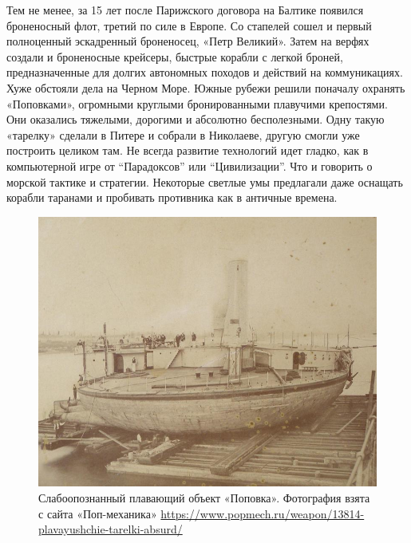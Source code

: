 Тем не менее, за 15 лет после Парижского договора на Балтике появился броненосный флот, третий по силе в Европе. Со стапелей сошел и первый полноценный эскадренный броненосец, «Петр Великий». Затем на верфях создали и броненосные крейсеры, быстрые корабли с легкой броней, предназначенные для долгих автономных походов и действий на коммуникациях. Хуже обстояли дела на Черном Море. Южные рубежи решили поначалу охранять «Поповками», огромными круглыми бронированными плавучими крепостями. Они оказались тяжелыми, дорогими и абсолютно бесполезными. Одну такую «тарелку» сделали в Питере и собрали в Николаеве, другую смогли уже построить целиком там. Не всегда развитие технологий идет гладко, как в компьютерной игре от “Парадоксов” или “Цивилизации”. Что и говорить о морской тактике и стратегии. Некоторые светлые умы предлагали даже оснащать корабли таранами и пробивать противника как в античные времена.

\begin{figure}[h!tb] 
	\centering\includegraphics[scale=0.4]{Data/RYAV_sily_storon/GJfhe1Pp85A.jpg}
	\caption{Слабоопознанный плавающий объект «Поповка». Фотография взята с сайта «Поп-механика» \url{https://www.popmech.ru/weapon/13814-plavayushchie-tarelki-absurd/}}%
\end{figure}

